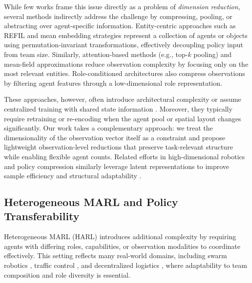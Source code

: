 \documentclass{article}
\begin{document}
        While few works frame this issue directly as a problem of \textit{dimension reduction}, 
        several methods indirectly address the challenge by compressing, pooling, 
        or abstracting over agent-specific information.
        Entity-centric approaches such as REFIL \cite{iqbal2021} and mean embedding strategies
        \cite{huttenrauch2019} represent a collection of agents or objects using permutation-invariant
        transformations, effectively decoupling policy input from team size. Similarly, attention-based methods
        (e.g., top-$k$ pooling) and mean-field approximations \cite{yang2021a} reduce observation complexity
        by focusing only on the most relevant entities. Role-conditioned architectures
        \cite{gupta2017, kouzeghar2023} also compress observations by filtering agent features through
        a low-dimensional role representation.
        
        These approaches, however, often introduce architectural complexity or assume centralized 
        training with shared state information \cite{foerster2017}. Moreover, they typically require 
        retraining or re-encoding when the agent pool or spatial layout changes significantly. 
        Our work takes a complementary approach: we treat the dimensionality of the observation vector 
        itself as a constraint and propose lightweight observation-level reductions that preserve 
        task-relevant structure while enabling flexible agent counts. 
        Related efforts in high-dimensional robotics and policy compression similarly 
        leverage latent representations to improve sample efficiency and structural 
        adaptability \cite{bitzer2010, tangkaratt2016}.
        
        
        \subsection{Heterogeneous MARL and Policy Transferability}
        
        Heterogeneous MARL (HARL) introduces additional complexity by requiring agents with differing
        roles, capabilities, or observation modalities to coordinate effectively. This setting reflects
        many real-world domains, including swarm robotics \cite{hoang2023}, traffic control \cite{calvo2018},
        and decentralized logistics \cite{rizk2019}, where adaptability to team composition and role diversity
        is essential.
        
\end{document}
